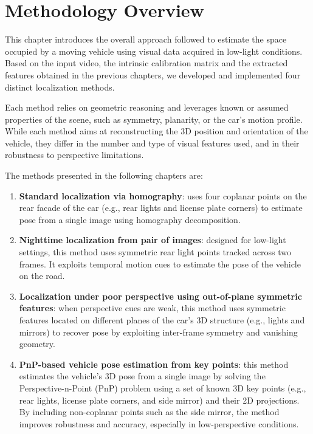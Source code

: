 \section{Methodology Overview}
This chapter introduces the overall approach followed to estimate the space occupied by a moving vehicle using visual data acquired in low-light conditions. Based on the input video, the intrinsic calibration matrix and the extracted features obtained in the previous chapters, we developed and implemented four distinct localization methods.

Each method relies on geometric reasoning and leverages known or assumed properties of the scene, such as symmetry, planarity, or the car's motion profile. While each method aims at reconstructing the 3D position and orientation of the vehicle, they differ in the number and type of visual features used, and in their robustness to perspective limitations.

The methods presented in the following chapters are:
\begin{enumerate}
    \item \textbf{Standard localization via homography}: uses four coplanar points on the rear facade of the car (e.g., rear lights and license plate corners) to estimate pose from a single image using homography decomposition.
    
    \item \textbf{Nighttime localization from pair of images}: designed for low-light settings, this method uses symmetric rear light points tracked across two frames. It exploits temporal motion cues to estimate the pose of the vehicle on the road.
    
    \item \textbf{Localization under poor perspective using out-of-plane symmetric features}: when perspective cues are weak, this method uses symmetric features located on different planes of the car's 3D structure (e.g., lights and mirrors) to recover pose by exploiting inter-frame symmetry and vanishing geometry.

    \item \textbf{PnP-based vehicle pose estimation from key points}: this method estimates the vehicle’s 3D pose from a single image by solving the Perspective-n-Point (PnP) problem using a set of known 3D key points (e.g., rear lights, license plate corners, and side mirror) and their 2D projections. By including non-coplanar points such as the side mirror, the method improves robustness and accuracy, especially in low-perspective conditions.
\end{enumerate}

